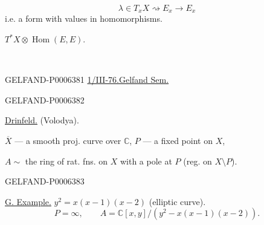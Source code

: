 \par\noindent\begin{minipage}{\linewidth}
\[
\lambda\in T_xX\rightsquigarrow E_x\to E_x
\]
i.e. a form with values in homomorphisms.

\underline{\(T^*X\otimes\operatorname{Hom}(E,E)\)}.

\begin{center}\textemdash\,\textperiodcentered\,\textemdash\end{center}
\end{minipage}\par


\begin{GelfandAdjacentEvidence}{GELFAND-P000638}{1}
\underline{1/III-76.}\quad \underline{Gelfand Sem.}
\end{GelfandAdjacentEvidence}
\begin{GelfandAdjacentEvidence}{GELFAND-P000638}{2}


\underline{Drinfeld.} (Volodya).

\(\overline X\) --- a smooth proj. curve over \(\mathbb C\),
\(P\) --- a fixed point on \(X\),

\(A\sim\) the ring of rat. fns. on \(X\) with a pole at \(P\)
(reg. on \(X\setminus P\)).
\end{GelfandAdjacentEvidence}
\begin{GelfandAdjacentEvidence}{GELFAND-P000638}{3}


\underline{G. Example.} \(y^2=x(x-1)(x-2)\) (elliptic curve).
\[
P=\infty,\qquad A=\mathbb C[x,y]/(y^2-x(x-1)(x-2)).
\]
\end{GelfandAdjacentEvidence}
